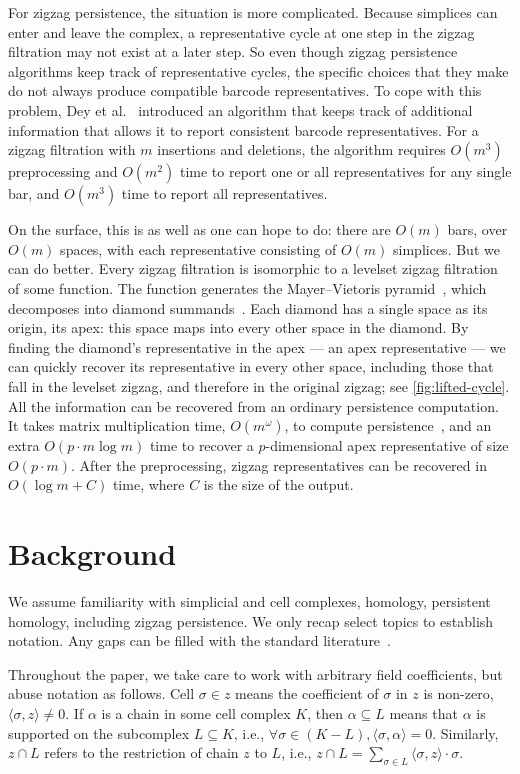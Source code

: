 \documentclass[cleveref,a4paper,english,nolineno]{socg-lipics-v2021}
\newcommand{\ssx}{\sigma}
\newcommand{\coeff}[2]{\langle #1, #2 \rangle}
\begin{document}
For zigzag persistence, the situation is more complicated. Because simplices can
enter and leave the complex, a representative cycle at one step in the zigzag
filtration may not exist at a later step. So even though zigzag persistence
algorithms keep track of representative cycles, the specific choices that they
make do not always produce compatible barcode representatives. To cope with this
problem, Dey et al.~\cite{DHM24} introduced an algorithm that keeps track of
additional information that allows it to report
consistent barcode representatives. For a zigzag filtration with $m$ insertions
and deletions, the algorithm
requires $O(m^3)$ preprocessing and $O(m^2)$ time to report one or all
representatives for any single bar, and $O(m^3)$ time to report all representatives.

On the surface, this is as well as one can hope to do: there are $O(m)$ bars,
over $O(m)$ spaces, with each representative consisting of $O(m)$ simplices.
But we can do better.
Every zigzag
filtration is isomorphic to a levelset zigzag filtration of some function.
The function generates the Mayer--Vietoris pyramid~\cite{CdSM09}, which
decomposes into diamond summands~\cite{BEMP13}. Each diamond has a single space
as its origin, its apex: this space maps into every other space in the diamond.
By finding the diamond's representative in
the apex --- an apex representative --- we can quickly recover its
representative in every other space, including those that fall in the levelset
zigzag, and therefore in the original zigzag; see \cref{fig:lifted-cycle}. All the information can be
recovered from an ordinary persistence computation. It takes
matrix multiplication time, $O(m^\omega)$, to compute persistence~\cite{MS24}, and an extra
$O(p \cdot m \log m)$ time to recover a $p$-dimensional
apex representative of size $O(p \cdot m)$. After the preprocessing, zigzag representatives
can be recovered in $O(\log m + C)$ time, where $C$ is the size of the output.

\section{Background}

We assume familiarity with simplicial and cell complexes, homology,
persistent homology, including zigzag persistence.
We only recap select topics to establish notation. Any
gaps can be filled with the standard literature~\cite{Hat02,EdHa10,EdMo17}.

Throughout the paper, we take care to work with arbitrary field coefficients,
but abuse notation as follows. Cell $\ssx \in z$ means the coefficient of $\ssx$ in
$z$ is non-zero, $\coeff{\ssx}{z} \neq 0$.
If $\alpha$ is a chain in some cell complex $K$, then $\alpha \subseteq L$ means that
$\alpha$ is supported on the subcomplex $L \subseteq K$, i.e., 
$\forall \ssx \in (K - L), \coeff{\ssx}{\alpha} = 0$.
Similarly, $z \cap L$ refers to the restriction of chain $z$ to $L$, i.e.,
$z \cap L = \sum_{\ssx \in L} \coeff{\ssx}{z} \cdot \ssx$.
\end{document}
